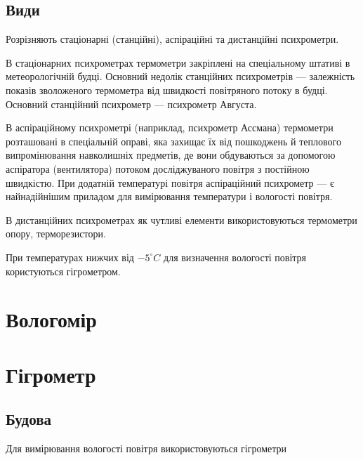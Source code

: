 \subsection{Види}

Розрізняють стаціонарні (станційні), аспіраційні та дистанційні психрометри.

В стаціонарних психрометрах термометри закріплені на спеціальному штативі в метеорологічній
будці. Основний недолік станційних психрометрів --- залежність показів зволоженого термометра від
швидкості повітряного потоку в будці. Основний станційний психрометр --- психрометр Августа.

В аспіраційному психрометрі (наприклад, психрометр Ассмана) термометри розташовані в спеціальній
оправі, яка захищає їх від пошкоджень й теплового випромінювання навколишніх предметів, де вони
обдуваються за допомогою аспіратора (вентилятора) потоком досліджуваного повітря з постійною
швидкістю. При додатній температурі повітря аспіраційний психрометр --- є найнадійнішим приладом для
вимірювання температури і вологості повітря.

В дистанційних психрометрах як чутливі елементи використовуються термометри опору, терморезистори.

При температурах нижчих від $-5^{\circ}C$ для визначення вологості повітря користуються гігрометром.

\section{Вологомір}

\section{Гігрометр}

\subsection{Будова}

Для вимірювання вологості повітря використовуються гігрометри